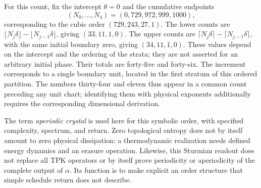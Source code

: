

For this count, fix the intercept \(\theta=0\) and the cumulative endpoints
\[
(N_0,\ldots,N_4)=(0,729,972,999,1000),
\]
corresponding to the cubic order \((729,243,27,1)\). The lower counts are \(\lfloor N_j\delta\rfloor-\lfloor N_{j-1}\delta\rfloor\), giving \((33,11,1,0)\). The upper counts are \(\lceil N_j\delta\rceil-\lceil N_{j-1}\delta\rceil\), with the same initial boundary zero, giving \((34,11,1,0)\). These values depend on the intercept and the ordering of the strata; they are not asserted for an arbitrary initial phase. Their totals are forty-five and forty-six. The increment corresponds to a single boundary unit, located in the first stratum of this ordered partition. The numbers thirty-four and eleven thus appear in a common count preceding any unit chart; identifying them with physical exponents additionally requires the corresponding dimensional derivation.

The term \emph{aperiodic crystal} is used here for this symbolic order, with specified complexity, spectrum, and return. Zero topological entropy does not by itself amount to zero physical dissipation: a thermodynamic realization needs defined energy dynamics and an erasure operation. Likewise, this Sturmian readout does not replace all TPK operators or by itself prove periodicity or aperiodicity of the complete output of \(\alpha\). Its function is to make explicit an order structure that simple schedule return does not describe.




